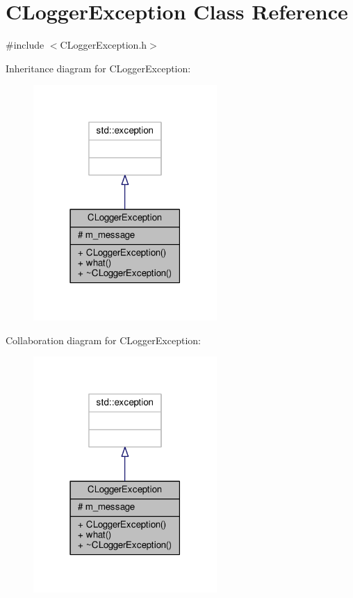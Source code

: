 \hypertarget{classCLoggerException}{\section{C\-Logger\-Exception Class Reference}
\label{classCLoggerException}
}


{\ttfamily \#include $<$C\-Logger\-Exception.\-h$>$}



Inheritance diagram for C\-Logger\-Exception\-:
\nopagebreak
\begin{figure}[H]
\begin{center}
\leavevmode
\includegraphics[width=198pt]{dd/d50/classCLoggerException__inherit__graph}
\end{center}
\end{figure}


Collaboration diagram for C\-Logger\-Exception\-:
\nopagebreak
\begin{figure}[H]
\begin{center}
\leavevmode
\includegraphics[width=198pt]{d2/d86/classCLoggerException__coll__graph}
\end{center}
\end{figure}
